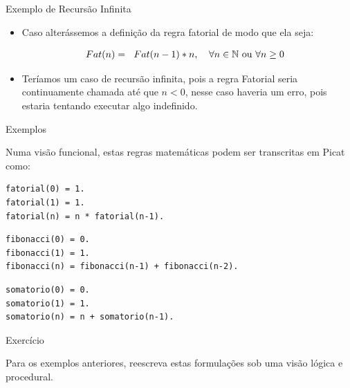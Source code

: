 \begin{frame}{Exemplo de Recursão Infinita}

    \begin{itemize}
        \item Caso alterássemos a definição da regra fatorial de modo que ela seja:
        
        \[
        Fat(n)= 
        \begin{tabular}[c]{ll}
            $Fat(n-1)\ast n$, &$\forall n \in \mathbb{N}$ ou $\forall n \geq 0$
        \end{tabular}
        \]
        
        \item Teríamos um caso de recursão infinita, pois a regra Fatorial seria continuamente
        chamada até que $n < 0$, nesse caso haveria um erro, pois estaria tentando executar algo indefinido.
        
    \end{itemize}

\end{frame}



\begin{frame}[fragile]{Exemplos}

Numa visão funcional, estas regras matemáticas podem ser transcritas em Picat como:

    \begin{lstlisting}[frame=single]
fatorial(0) = 1.
fatorial(1) = 1.
fatorial(n) = n * fatorial(n-1).
    \end{lstlisting}

    \begin{lstlisting}[frame=single]
fibonacci(0) = 0.
fibonacci(1) = 1.
fibonacci(n) = fibonacci(n-1) + fibonacci(n-2).
    \end{lstlisting}

    \begin{lstlisting}[frame=single]
somatorio(0) = 0.
somatorio(1) = 1.
somatorio(n) = n + somatorio(n-1).
    \end{lstlisting}

\end{frame}

\begin{frame}[fragile]{Exercício}

Para os exemplos anteriores, reescreva
estas formulações sob uma visão
lógica e  procedural.

\end{frame}


